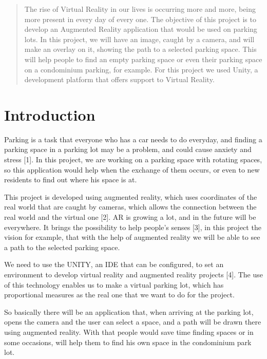 \documentclass[11pt]{article}
\begin{document}
\vspace{2cm}
\begin{multicols}{2}
    \begin{abstract}
    The rise of Virtual Reality in our lives is occurring more and more, being more present in every day of every one. The objective of this project is to develop an Augmented Reality application that would be used on parking lots. In this project, we will have an image, caught by a camera,  and will make an overlay on it, showing the path to a selected parking space. This will help people to find an empty parking space or even their parking space on a condominium parking, for example. For this project we used Unity, a development platform that offers support to Virtual Reality.
    \end{abstract}

    \section{Introduction}
    Parking is a task that everyone who has a car needs to do everyday, and finding a parking space in a parking lot may be a problem, and could cause anxiety and stress [1]. In this project, we are working on a parking space with rotating spaces, so this application would help when the exchange of them occurs, or even to new residents to find out where his space is at.

	This project is developed using augmented reality, which uses coordinates of the real world that are caught by cameras, which allows the connection between the real world and the virtual one [2]. AR is growing a lot, and in the future will be everywhere. It brings the possibility to help people’s senses [3], in this project the vision for example, that with the help of augmented reality we will be able to see a path to the selected parking space.
    
    We need to use the UNITY, an IDE that can be configured, to set an environment to develop virtual reality and augmented reality projects [4]. The use of this technology enables us to make a virtual parking lot, which has proportional measures as the real one that we want to do for the project. 
    
    So basically there will be an application that, when arriving at the parking lot, opens the camera and the user can select a space, and a path will be drawn there using augmented reality. With that people would save time finding spaces or in some occasions, will help them to find his own space in the condominium park lot.


\end{multicols}
\end{document}
